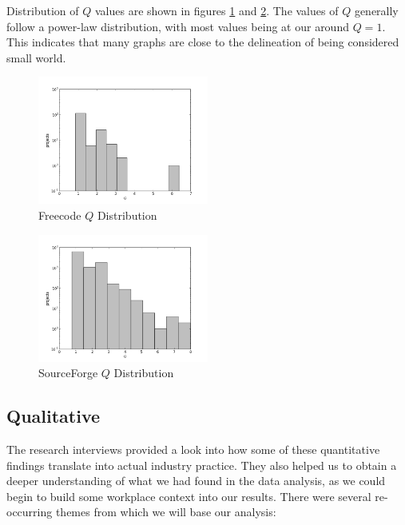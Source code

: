 \documentclass{proc}
\begin{document}
Distribution of $Q$ values are shown in figures \ref{fig:q_fc_distribution} and \ref{fig:q_sf_distribution}. The values of $Q$ generally follow a power-law distribution, with most values being at our around {$Q = 1$}. This indicates that many graphs are close to the delineation of being considered small world\cite{humphries2008network}.

\begin{figure}
\begin{center}
\includegraphics[width=0.5\textwidth]{images/freecode-q-histo.png}
\end{center}
\caption{Freecode $Q$ Distribution}
\label{fig:q_fc_distribution}
\end{figure}

\begin{figure}
\begin{center}
\includegraphics[width=0.5\textwidth]{images/sf-q-histo.png}
\end{center}
\caption{SourceForge $Q$ Distribution}
\label{fig:q_sf_distribution}
\end{figure}

\subsection{Qualitative}
The research interviews provided a look into how some of these quantitative findings translate into actual industry practice. They also helped us to obtain a deeper understanding of what we had found in the data analysis, as we could begin to build some workplace context into our results. There were several re-occurring themes from which we will base our analysis\cite{stmartin_interview,rana_interview}:
\end{document}
